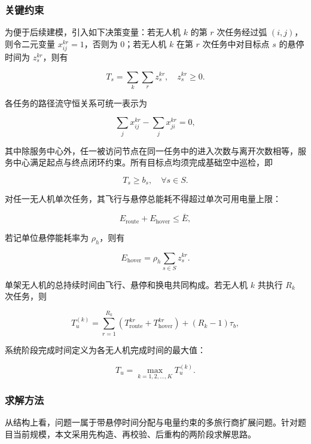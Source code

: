 \documentclass[12pt]{article}
\begin{document}
\subsubsection{关键约束}
为便于后续建模，引入如下决策变量：若无人机 $k$ 的第 $r$ 次任务经过弧 $(i,j)$，则令二元变量 $x_{ij}^{kr}=1$，否则为 0；若无人机 $k$ 在第 $r$ 次任务中对目标点 $s$ 的悬停时间为 $z_s^{kr}$，则有

\begin{equation}
T_s = \sum_k \sum_r z_s^{kr}, \quad z_s^{kr} \ge 0.
\end{equation}

各任务的路径流守恒关系可统一表示为

\begin{equation}
\sum_j x_{ij}^{kr} - \sum_j x_{ji}^{kr} = 0,
\end{equation}

其中除服务中心外，任一被访问节点在同一任务中的进入次数与离开次数相等，服务中心满足起点与终点闭环约束。所有目标点均须完成基础空中巡检，即

\begin{equation}
T_s \ge b_s, \quad \forall s \in S.
\end{equation}

对任一无人机单次任务，其飞行与悬停总能耗不得超过单次可用电量上限：

\begin{equation}
E_{\text{route}} + E_{\text{hover}} \le \bar{E},
\end{equation}

若记单位悬停能耗率为 $\rho_h$，则有

\begin{equation}
E_{\text{hover}} = \rho_h \sum_{s \in S} z_s^{kr}.
\end{equation}

单架无人机的总持续时间由飞行、悬停和换电共同构成。若无人机 $k$ 共执行 $R_k$ 次任务，则

\begin{equation}
T_u^{(k)} = \sum_{r=1}^{R_k} \left(T_{\text{route}}^{kr} + T_{\text{hover}}^{kr}\right) + (R_k-1)\tau_b,
\end{equation}

系统阶段完成时间定义为各无人机完成时间的最大值：

\begin{equation}
T_u = \max_{k=1,2,\dots,K} T_u^{(k)}.
\end{equation}

\subsubsection{求解方法}
从结构上看，问题一属于带悬停时间分配与电量约束的多旅行商扩展问题。针对题目当前规模，本文采用先构造、再校验、后重构的两阶段求解思路。
\end{document}
